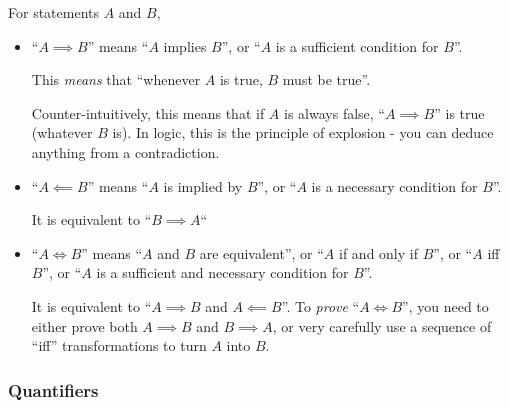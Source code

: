For statements \(A\) and \(B\),
\begin{itemize}
 \item
  ``\(A \implies B\)'' means ``\(A\) implies \(B\)'', or
  ``\(A\) is a sufficient condition for \(B\)''.

  This \emph{means} that ``whenever \(A\) is true, \(B\) must be true''.

  Counter-intuitively, this means that if \(A\) is always false,
  ``\(A \implies B\)'' is true (whatever \(B\) is). In logic, this is the
  principle of explosion - you can deduce anything from a contradiction.
 \item
  ``\(A \impliedby B\)'' means ``\(A\) is implied by \(B\)'', or
  ``\(A\) is a necessary condition for \(B\)''.

  It is equivalent to ``\(B \implies A\)``
 \item
  ``\(A \iff B\)'' means ``\(A\) and \(B\) are equivalent'', or
  ``\(A\) if and only if \(B\)'', or ``\(A\) iff \(B\)'', or
  ``\(A\) is a sufficient and necessary condition for \(B\)''.

  It is equivalent to ``\(A \implies B\) and \(A \impliedby B\)''. To
  \emph{prove} ``\(A \iff B\)'', you need to either prove both
  \(A \implies B\) and \(B \implies A\), or very carefully use a sequence of
  ``iff'' transformations to turn \(A\) into \(B\).
\end{itemize}

\subsubsection*{Quantifiers}


